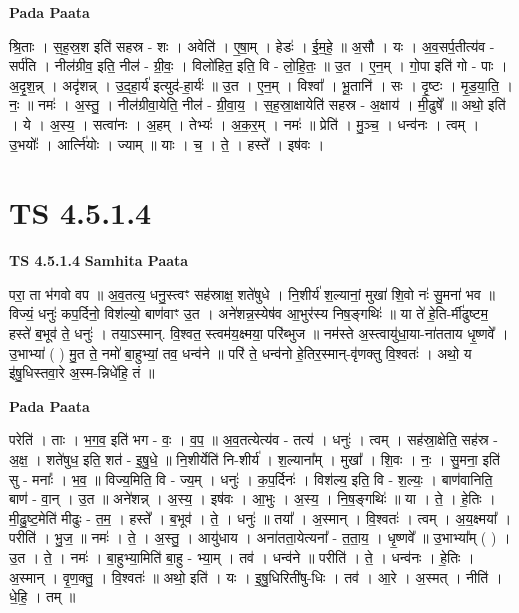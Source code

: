 \documentclass[17pt]{extarticle}
\begin{document}
\textbf{Pada Paata} \newline

श्रि॒ताः । स॒ह॒स्र॒श इति॑ सहस्र - शः । अवेति॑ । ए॒षा॒म् । हेडः॑ । ई॒म॒हे॒ ॥ अ॒सौ । यः । अ॒व॒सर्प॒तीत्य॑व - सर्प॑ति । नील॑ग्रीव॒ इति॒ नील॑ - ग्री॒वः॒ । विलो॑हित॒ इति॒ वि - लो॒हि॒तः॒ ॥ उ॒त । ए॒न॒म् । गो॒पा इति॑ गो - पाः । अ॒दृ॒श॒न्न् । अदृ॑शन्न् । उ॒द॒हा॒र्य॑ इत्युद॑-हा॒र्यः॑ ॥ उ॒त । ए॒न॒म् । विश्वा᳚ । भू॒तानि॑ । सः । दृ॒ष्टः । मृ॒ड॒या॒ति॒ । नः॒ ॥ नमः॑ । अ॒स्तु॒ । नील॑ग्रीवा॒येति॒ नील॑ - ग्री॒वा॒य॒ । स॒ह॒स्रा॒क्षायेति॑ सहस्र - अ॒क्षाय॑ । मी॒ढुषे᳚ ॥ अथो॒ इति॑ । ये । अ॒स्य॒ । सत्वा॑नः । अ॒हम् । तेभ्यः॑ । अ॒क॒र॒म् । नमः॑ ॥ प्रेति॑ । मु॒ञ्च॒ । धन्व॑नः । त्वम् । उ॒भयोः᳚ । आर्त्नि॑योः । ज्याम् ॥ याः । च॒ । ते॒ । हस्ते᳚ । इष॑वः ।  \newline




\section*{ TS 4.5.1.4 }

\textbf{TS 4.5.1.4 } \newline
\textbf{Samhita Paata} \newline

परा॒ ता भ॑गवो वप ॥                                        अ॒व॒तत्य॒ धनु॒स्त्वꣳ सह॑स्राक्ष॒ शते॑षुधे । नि॒शीर्य॑ श॒ल्यानां॒ मुखा॑ शि॒वो नः॑ सु॒मना॑ भव ॥                          विज्यं॒ धनुः॑ कप॒र्दिनो॒ विश॑ल्यो॒ बाण॑वाꣳ उ॒त । अने॑शन्न॒स्येष॑व आ॒भुर॑स्य निष॒ङ्गथिः॑ ॥                                               या ते॑ हे॒ति-र्मी॑ढुष्टम॒ हस्ते॑ ब॒भूव॑ ते॒ धनुः॑ । तया॒ऽस्मान्. वि॒श्वत॒ स्त्वम॑य॒क्ष्मया॒ परि॑ब्भुज ॥                                  नम॑स्ते अ॒स्त्वायु॑धा॒या-ना॑तताय धृ॒ष्णवे᳚ । उ॒भाभ्या॑ ( ) मु॒त ते॒ नमो॑ बा॒हुभ्यां॒ तव॒ धन्व॑ने ॥                      परि॑ ते॒ धन्व॑नो हे॒तिर॒स्मान्-वृ॑णक्तु वि॒श्वतः॑ । अथो॒ य इ॑षु॒धिस्तवा॒रे अ॒स्म-न्निधे॑हि॒ तं ॥ \newline

\textbf{Pada Paata} \newline

परेति॑ । ताः । भ॒ग॒व॒ इति॑ भग - वः॒ । व॒प॒ ॥ अ॒व॒तत्येत्य॑व - तत्य॑ । धनुः॑ । त्वम् । सह॑स्रा॒क्षेति॒ सह॑स्र - अ॒क्ष॒ । शते॑षुध॒ इति॒ शत॑ - इ॒षु॒धे॒ ॥ नि॒शीर्येति॑ नि-शीर्य॑ । श॒ल्याना᳚म् । मुखा᳚ । शि॒वः । नः॒ । सु॒मना॒ इति॑ सु - मनाः᳚ । भ॒व॒ ॥ विज्य॒मिति॒ वि - ज्य॒म् । धनुः॑ । क॒प॒र्दिनः॑ । विश॑ल्य॒ इति॒ वि - श॒ल्यः॒ । बाण॑वानिति॒ बाण॑ - वा॒न् । उ॒त ॥ अने॑शन्न् । अ॒स्य॒ । इष॑वः । आ॒भुः । अ॒स्य॒ । नि॒ष॒ङ्गथिः॑ ॥ या । ते॒ । हे॒तिः । मी॒ढु॒ष्ट॒मेति॑ मीढुः - त॒म॒ । हस्ते᳚ । ब॒भूव॑ । ते॒ । धनुः॑ ॥ तया᳚ । अ॒स्मान् । वि॒श्वतः॑ । त्वम् । अ॒य॒क्ष्मया᳚ । परीति॑ । भु॒ज॒ ॥ नमः॑ । ते॒ । अ॒स्तु॒ । आयु॑धाय । अना॑तता॒येत्यना᳚ - त॒ता॒य॒ । धृ॒ष्णवे᳚ ॥ उ॒भाभ्या᳚म् ( ) । उ॒त । ते॒ । नमः॑ । बा॒हुभ्या॒मिति॑ बा॒हु - भ्या॒म् । तव॑ । धन्व॑ने ॥ परीति॑ । ते॒ । धन्व॑नः । हे॒तिः । अ॒स्मान् । वृ॒ण॒क्तु॒ । वि॒श्वतः॑ ॥ अथो॒ इति॑ । यः । इ॒षु॒धिरिती॑षु-धिः । तव॑ । आ॒रे । अ॒स्मत् । नीति॑ । धे॒हि॒ । तम् ॥  \newline
\end{document}
